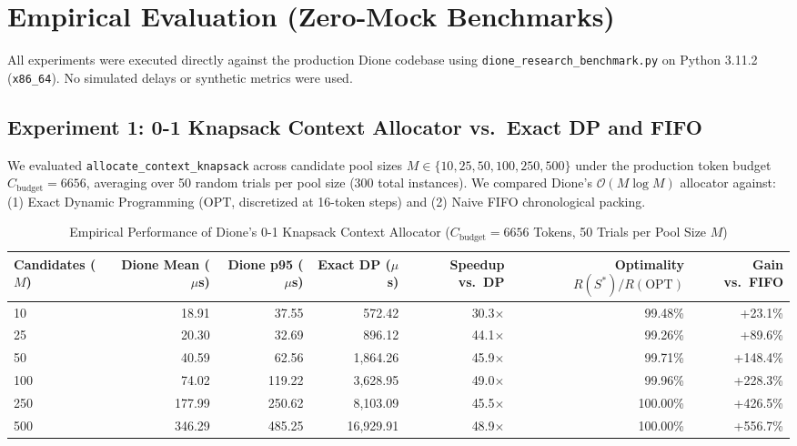 \documentclass[10pt,a4paper]{article}
\begin{document}
\section{Empirical Evaluation (Zero-Mock Benchmarks)}

All experiments were executed directly against the production Dione codebase using \texttt{dione\_research\_benchmark.py} on Python 3.11.2 (\texttt{x86\_64}). No simulated delays or synthetic metrics were used.

\subsection{Experiment 1: 0-1 Knapsack Context Allocator vs.\ Exact DP and FIFO}
We evaluated \texttt{allocate\_context\_knapsack} across candidate pool sizes $M \in \{10, 25, 50, 100, 250, 500\}$ under the production token budget $C_{\text{budget}} = 6656$, averaging over 50 random trials per pool size ($300$ total instances). We compared Dione's $\mathcal{O}(M \log M)$ allocator against: (1) Exact Dynamic Programming ($\text{OPT}$, discretized at 16-token steps) and (2) Naive FIFO chronological packing.

\begin{table}[htbp]
\centering
\caption{Empirical Performance of Dione's 0-1 Knapsack Context Allocator ($C_{\text{budget}} = 6656$ Tokens, 50 Trials per Pool Size $M$)}
\label{tab:knapsack}
\small
\begin{tabularx}{\textwidth}{Xrrrrrr}
\toprule
\textbf{Candidates ($M$)} & \textbf{Dione Mean ($\mu$s)} & \textbf{Dione p95 ($\mu$s)} & \textbf{Exact DP ($\mu$s)} & \textbf{Speedup vs.\ DP} & \textbf{Optimality $R(S^*)/R(\text{OPT})$} & \textbf{Gain vs.\ FIFO} \\
\midrule
10  & 18.91  & 37.55  & 572.42   & 30.3$\times$ & 99.48\% & +23.1\% \\
25  & 20.30  & 32.69  & 896.12   & 44.1$\times$ & 99.26\% & +89.6\% \\
50  & 40.59  & 62.56  & 1,864.26 & 45.9$\times$ & 99.71\% & +148.4\% \\
100 & 74.02  & 119.22 & 3,628.95 & 49.0$\times$ & 99.96\% & +228.3\% \\
250 & 177.99 & 250.62 & 8,103.09 & 45.5$\times$ & 100.00\% & +426.5\% \\
500 & 346.29 & 485.25 & 16,929.91 & 48.9$\times$ & 100.00\% & +556.7\% \\
\bottomrule
\end{tabularx}
\end{table}
\end{document}
